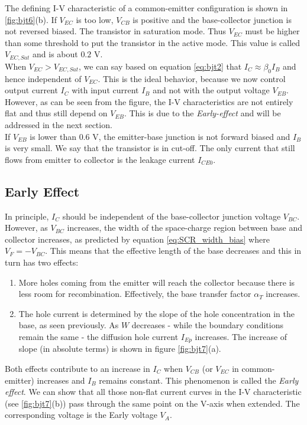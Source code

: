 The defining I-V characteristic of a common-emitter configuration is shown in \ref{fig:bjt6}(b). If $V_{EC}$ is too low, $V_{CB}$ is positive and the base-collector junction is not reversed biased. The transistor in saturation mode. Thus $V_{EC}$ must be higher than some threshold to put the transistor in the active mode. This value is called $V_{EC, Sat}$ and is about $0.2$ V.\\
When $V_{EC} > V_{EC, Sat}$, we can say based on equation \ref{eq:bjt2} that $I_C \approx \beta_0 I_B$ and hence independent of $V_{EC}$. This is the ideal behavior, because we now control output current $I_C$ with input current $I_B$ and not with the output voltage $V_{EB}$. However, as can be seen from the figure, the I-V characteristics are not entirely flat and thus still depend on $V_{EB}$. This is due to the \emph{Early-effect} and will be addressed in the next section.\\
If $V_{EB}$ is lower than $0.6$ V, the emitter-base junction is not forward biased and $I_B$ is very small. We say that the transistor is in cut-off. The only current that still flows from emitter to collector is the leakage current $I_{CE0}$.

\subsection{Early Effect}
In principle, $I_C$ should be independent of the base-collector junction voltage $V_{BC}$. However, as $V_{BC}$ increases, the width of the space-charge region between base and collector increases, as predicted by equation \ref{eq:SCR_width_bias} where $V_F = -V_{BC}$. This means that the effective length of the base decreases and this in turn has two effects:
\begin{enumerate}
    \item More holes coming from the emitter will reach the collector because there is less room for recombination. Effectively, the base transfer factor $\alpha_T$ increases.
    \item The hole current is determined by the slope of the hole concentration in the base, as seen previously. As $W$ decreases - while the boundary conditions remain the same - the diffusion hole current $I_{Ep}$ increases. The increase of slope (in absolute terms) is shown in figure \ref{fig:bjt7}(a).
\end{enumerate}
Both effects contribute to an increase in $I_C$ when $V_{CB}$ (or $V_{EC}$ in common-emitter) increases and $I_B$ remains constant. This phenomenon is called the \emph{Early effect}. We can show that all those non-flat current curves in the I-V characteristic (see \ref{fig:bjt7}(b)) pass through the same point on the V-axis when extended. The corresponding voltage is the Early voltage $V_A$.

